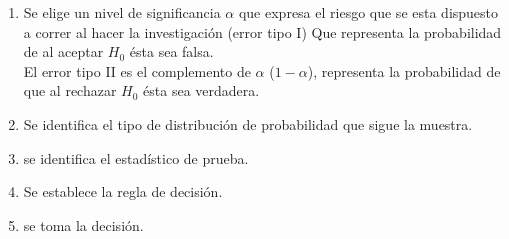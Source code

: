 \begin{enumerate}
\begin{enumerate}
\begin{minipage}[b]{\textwidth}
\begin{minipage}[b]{0.3 \textwidth}
    \end{minipage}
    \end{minipage}
\end{enumerate}
\item Se elige un nivel de significancia $\alpha$ que expresa el riesgo que se esta dispuesto a correr al hacer la investigación (error tipo I) Que representa la probabilidad de al aceptar $H_0$ ésta sea falsa.\\
El error tipo II es el  complemento de $\alpha$ ($1-\alpha$), representa la probabilidad de que al rechazar $H_0$ ésta sea verdadera.


\item Se identifica el tipo de distribución de probabilidad que sigue la muestra.
		
\item se identifica el estadístico de prueba.

\item Se establece la regla de decisión.

\item se toma la decisión.
		




	\end{enumerate}	
